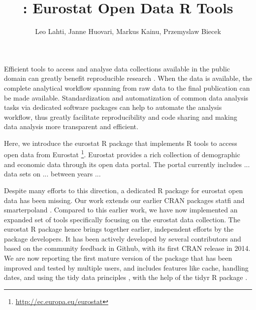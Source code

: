 \title{: Eurostat Open Data R Tools}
\author{Leo Lahti, Janne Huovari, Markus Kainu, Przemyslaw Biecek}

\maketitle



Efficient tools to access and analyse data collections available in
the public domain can greatly benefit reproducible
research \citep{Gandrud13}. When the data is available, the complete
analytical workflow spanning from raw data to the final publication
can be made available. Standardization and automatization of common
data analysis tasks via dedicated software packages can help to
automate the analysis workflow, thus greatly facilitate
reproducibility and code sharing and making data analysis more
transparent and efficient. 

Here, we introduce the eurostat R package that implements R tools to
access open data from
Eurostat \footnote{\url{http://ec.europa.eu/eurostat}}. Eurostat
provides a rich collection of demographic and economic data through
its open data portal. The portal currently includes ... data sets on
... between years ...

Despite many efforts to this direction, a dedicated R package for
eurostat open data has been missing. Our work extends our earlier CRAN
packages statfi \citep{statfi} and smarterpoland
\citep{smarterpoland}. Compared to this earlier work, we have now
implemented an expanded set of tools specifically focusing on the
eurostat data collection. The eurostat R package hence brings together
earlier, independent efforts by the package developers. It has been
actively developed by several contributors and based on the community
feedback in Github, with its first CRAN release in 2014. We are now
reporting the first mature version of the package that has been
improved and tested by multiple users, and includes features like
cache, handling dates, and using the tidy data
principles \citep{wickham2014}, with the help of the tidyr R
package \citep{tidyr}.


